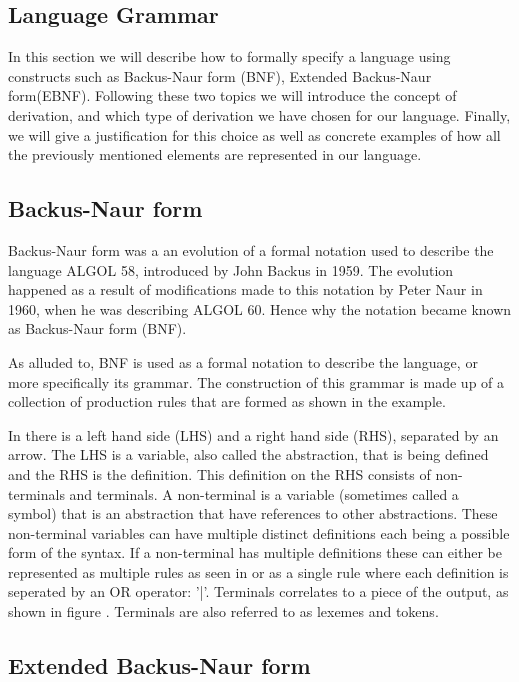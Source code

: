 \subsection{Language Grammar} \label{langGram}

In this section we will describe how to formally specify a language using constructs such as Backus-Naur form (BNF), Extended Backus-Naur form(EBNF).
Following these two topics we will introduce the concept of derivation, and which type of derivation we have chosen for our language.
Finally, we will give a justification for this choice as well as concrete examples of how all the previously mentioned elements are represented in our language.

\subsection{Backus-Naur form}

Backus-Naur form was a an evolution of a formal notation used to describe the language ALGOL 58, introduced by John Backus in 1959. The evolution happened as a result of modifications
made to this notation by Peter Naur in 1960, when he was describing ALGOL 60. Hence why the notation became known as Backus-Naur form (BNF)\cite{sebesta_concepts_2016}.

As alluded to, BNF is used as a formal notation to describe the language, or more specifically its grammar. The construction of this grammar is made up of a collection of production rules that are formed as shown in the example.

In  there is a left hand side (LHS) and a right hand side (RHS), separated by an arrow. The LHS is a variable, also called the abstraction, that is being defined and the RHS is the definition.
This definition on the RHS consists of non-terminals and terminals. A non-terminal is a variable (sometimes called a symbol) that is an abstraction that have references to other abstractions.
These non-terminal variables can have multiple distinct definitions each being a possible form of the syntax. If a non-terminal has multiple definitions these can either be represented as multiple
rules as seen in  or as a single rule where each definition is seperated by an OR operator: '|'. Terminals correlates to a piece of the output, as shown in figure .
Terminals are also referred to as lexemes and tokens\cite{sebesta_concepts_2016}.

\subsection{Extended Backus-Naur form}

